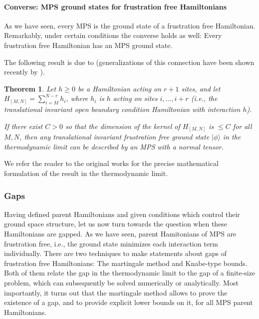 \documentclass[rmp,aps,reprint,superscriptaddress,nobalancelastpage]{revtex4-1}
\newtheorem{thm}{Theorem}[section]
\newcommand{\ket}[1]{\vert#1\rangle}
\begin{document}
\paragraph{Converse: MPS ground states for frustration free Hamiltonians}

As we have seen, every MPS is the ground state of a frustration free Hamiltonian. Remarkably, under certain conditions the converse holds as well: Every frustration free Hamiltonian has an MPS ground state.

The following result is due to \textcite{matsui:gapped-ham-vs-mps}
(generalizations of this connection have been shown recently by
\textcite{ogata:gapped-ham-vs-mps-I,ogata:gapped-ham-vs-mps-II,ogata:gapped-ham-vs-mps-III}).

\begin{thm}
    Let $h\ge0$ be a Hamiltonian acting on $r+1$ sites, and let
    $H_{[M,N]}=\sum_{i=M}^{N-r} h_i$, where $h_i$ is $h$ acting on sites $i,\dots,i+r$ (i.e., the translational invariant open boundary condition Hamiltonian with interaction $h$).

    If there exist $C>0$ so that the dimension of the kernel of $H_{[M,N]}$ is $\le C$ for all $M,N$, then any translational invariant frustration free ground state $\ket\phi$ in the thermodynamic limit can be described by an MPS with a normal tensor.
\end{thm}
We refer the reader to the original works for the precise mathematical formulation of the result in the thermodynamic limit.



\subsubsection{Gaps\label{sec:4:hams-gaps}}

Having defined parent Hamiltonians and given conditions which control their ground space structure, let us now turn towards the question when these Hamiltonians are gapped.  As we have seen, parent Hamitonians of MPS are frustration free, i.e., the ground state minimizes each interaction term individually.  There are two techniques to make statements about gaps of frustration free Hamiltonians: The martingale method and Knabe-type bounds. Both of them relate the gap in the thermodynamic limit to the gap of a finite-size problem, which can subsequently be solved numerically or analytically.  Most importantly, it turns out that the martingale method allows to prove the existence of a gap, and to provide explicit lower bounds on it, for all MPS parent Hamiltonians.
\end{document}
